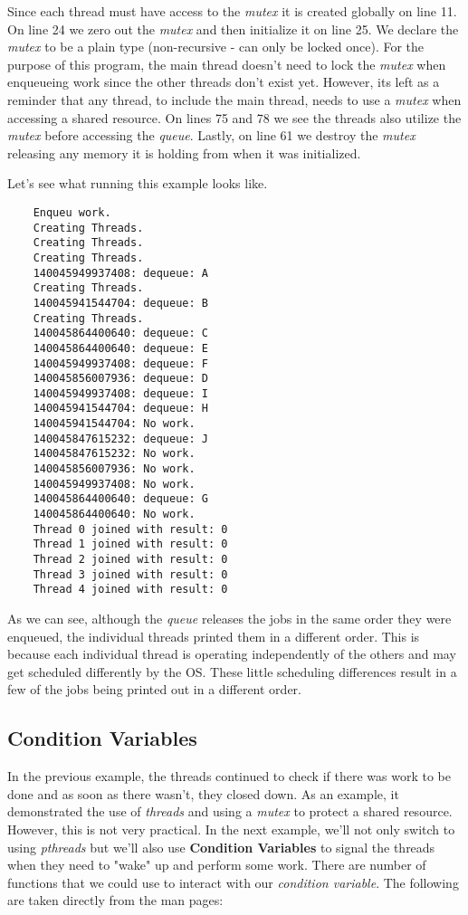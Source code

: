 \documentclass[../main.tex]{subfiles}
\begin{document}
	Since each thread must have access to the \textit{mutex} it is created globally on line 11.  On line 24 we zero out the \textit{mutex} and then initialize it on line 25.  We declare the \textit{mutex} to be a plain type (non-recursive - can only be locked once).  For the purpose of this program, the main thread doesn't need to lock the \textit{mutex} when enqueueing work since the other threads don't exist yet.  However, its left as a reminder that any thread, to include the main thread, needs to use a \textit{mutex} when accessing a shared resource.  On lines 75 and 78 we see the threads also utilize the \textit{mutex} before accessing the \textit{queue}.  Lastly, on line 61 we destroy the \textit{mutex} releasing any memory it is holding from when it was initialized.
	
	Let's see what running this example looks like.
	
	\begin{verbatim}
	Enqueu work.
	Creating Threads.
	Creating Threads.
	Creating Threads.
	140045949937408: dequeue: A
	Creating Threads.
	140045941544704: dequeue: B
	Creating Threads.
	140045864400640: dequeue: C
	140045864400640: dequeue: E
	140045949937408: dequeue: F
	140045856007936: dequeue: D
	140045949937408: dequeue: I
	140045941544704: dequeue: H
	140045941544704: No work.
	140045847615232: dequeue: J
	140045847615232: No work.
	140045856007936: No work.
	140045949937408: No work.
	140045864400640: dequeue: G
	140045864400640: No work.
	Thread 0 joined with result: 0
	Thread 1 joined with result: 0
	Thread 2 joined with result: 0
	Thread 3 joined with result: 0
	Thread 4 joined with result: 0
	\end{verbatim}
	
	As we can see, although the \textit{queue} releases the jobs in the same order they were enqueued, the individual threads printed them in a different order.  This is because each individual thread is operating independently of the others and may get scheduled differently by the OS.  These little scheduling differences result in a few of the jobs being printed out in a different order.
	
	\subsection{Condition Variables}
	
	In the previous example, the threads continued to check if there was work to be done and as soon as there wasn't, they closed down.  As an example, it demonstrated the use of \textit{threads} and using a \textit{mutex} to protect a shared resource.  However, this is not very practical.  In the next example, we'll not only switch to using \textit{pthreads} but we'll also use \textbf{Condition Variables} to signal the threads when they need to "wake" up and perform some work.  There are number of functions that we could use to interact with our \textit{condition variable}.  The following are taken directly from the man pages:
	
\end{document}
